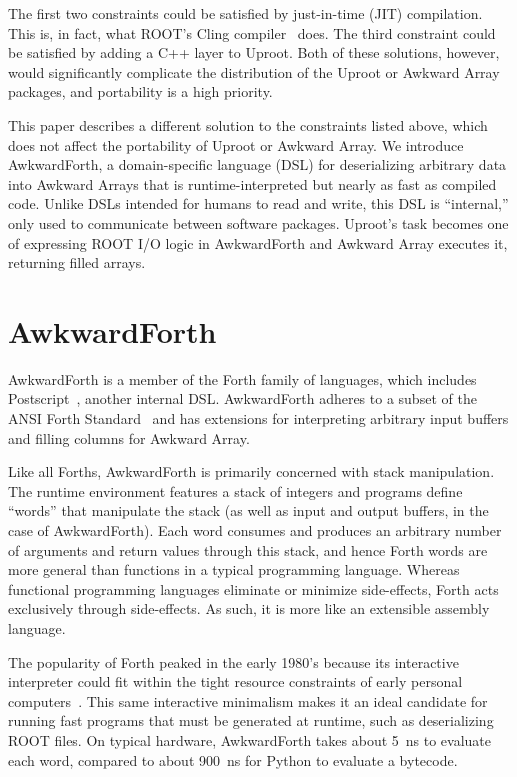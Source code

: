 \documentclass{webofc}
\begin{document}
The first two constraints could be satisfied by just-in-time (JIT) compilation. This is, in fact, what ROOT's Cling compiler~\cite{cling} does. The third constraint could be satisfied by adding a C++ layer to Uproot. Both of these solutions, however, would significantly complicate the distribution of the Uproot or Awkward Array packages, and portability is a high priority.

This paper describes a different solution to the constraints listed above, which does not affect the portability of Uproot or Awkward Array. We introduce AwkwardForth, a domain-specific language (DSL) for deserializing arbitrary data into Awkward Arrays that is runtime-interpreted but nearly as fast as compiled code. Unlike DSLs intended for humans to read and write, this DSL is ``internal,'' only used to communicate between software packages. Uproot's task becomes one of expressing ROOT I/O logic in AwkwardForth and Awkward Array executes it, returning filled arrays.

\section{AwkwardForth}

AwkwardForth is a member of the Forth family of languages, which includes Postscript~\cite{postscript}, another internal DSL. AwkwardForth adheres to a subset of the ANSI Forth Standard~\cite{forth-standard} and has extensions for interpreting arbitrary input buffers and filling columns for Awkward Array.

Like all Forths, AwkwardForth is primarily concerned with stack manipulation. The runtime environment features a stack of integers and programs define ``words'' that manipulate the stack (as well as input and output buffers, in the case of AwkwardForth). Each word consumes and produces an arbitrary number of arguments and return values through this stack, and hence Forth words are more general than functions in a typical programming language. Whereas functional programming languages eliminate or minimize side-effects, Forth acts exclusively through side-effects. As such, it is more like an extensible assembly language.

The popularity of Forth peaked in the early 1980's because its interactive interpreter could fit within the tight resource constraints of early personal computers~\cite{forth}. This same interactive minimalism makes it an ideal candidate for running fast programs that must be generated at runtime, such as deserializing ROOT files. On typical hardware, AwkwardForth takes about 5~ns to evaluate each word, compared to about 900~ns for Python to evaluate a bytecode.
\end{document}
